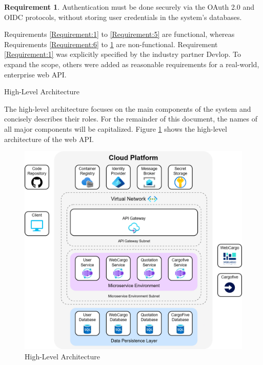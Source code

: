 \documentclass[12pt, reqno]{amsbook}
\makeatletter
\def\section{\@startsection{section}{1}%
      \z@{.5\linespacing\@plus.7\linespacing}{.25\linespacing}%
      {\normalfont\bfseries\flushleft}}
\theoremstyle{definition}
\theoremstyle{definition}
\newtheorem{requirement}{Requirement}
\numberwithin{section}{chapter}
\numberwithin{table}{chapter}
\numberwithin{figure}{chapter}
\makeatother
\begin{document}
\begin{requirement}
  \label{Requirement:12}
  Authentication must be done securely via the \ac{OAuth} 2.0 and \ac{OIDC} protocols, without storing user credentials in the system's databases.
\end{requirement}


Requirements \ref{Requirement:1} to \ref{Requirement:5} are functional, whereas Requirements \ref{Requirement:6} to \ref{Requirement:12} are non-functional. Requirement \ref{Requirement:1} was explicitly specified by the industry partner Devlop. To expand the scope, others were added as reasonable requirements for a real-world, enterprise web \ac{API}.

\section{High-Level Architecture}
\label{Section:High_Level_Architecture}

The high-level architecture focuses on the main components of the system and concisely describes their roles. For the remainder of this document, the names of all major components will be capitalized. Figure \ref{Figure:High_Level_Architecture} shows the high-level architecture of the web \ac{API}.

\begin{figure}[H]
  \centering
  \includegraphics[width=0.95\linewidth]{images/HighLevelArchitecture.png}
  \caption{\label{Figure:High_Level_Architecture}High-Level Architecture}
\end{figure}
\end{document}
